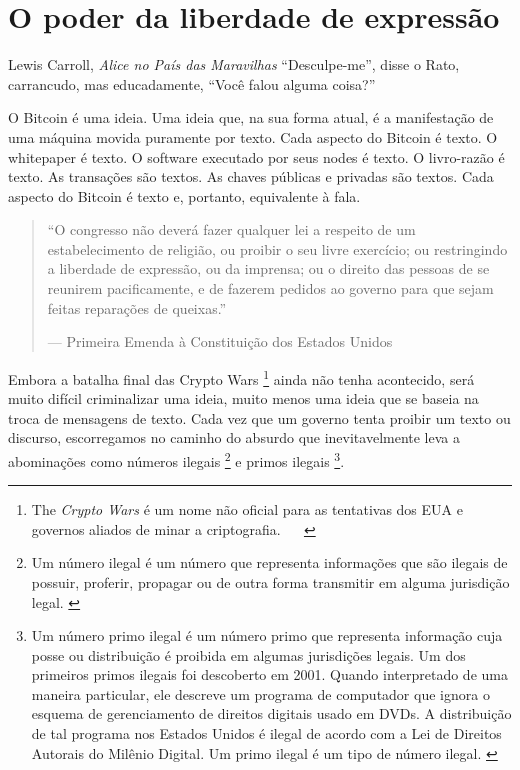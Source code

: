 \chapter{O poder da liberdade de expressão}
\label{les:6}

\begin{chapquote}{Lewis Carroll, \textit{Alice no País das Maravilhas}}
\enquote{Desculpe-me}, disse o Rato, carrancudo, mas educadamente, \enquote{Você falou alguma coisa?}
\end{chapquote}

O Bitcoin é uma ideia. Uma ideia que, na sua forma atual, é a manifestação de uma máquina movida puramente por texto. Cada aspecto do Bitcoin é texto. O whitepaper é texto. O software executado por seus nodes é texto. O livro-razão é texto. As transações são textos. As chaves públicas e privadas são textos. Cada aspecto do Bitcoin é texto e, portanto, equivalente à fala.

\begin{quotation}\begin{samepage}
\enquote{O congresso não deverá fazer qualquer lei a respeito de um estabelecimento de religião, ou proibir o seu livre exercício; ou restringindo a liberdade de expressão, ou da imprensa; ou o direito das pessoas de se reunirem pacificamente, e de fazerem pedidos ao governo para que sejam feitas reparações de queixas.}
\begin{flushright} --- Primeira Emenda à Constituição dos Estados Unidos
\end{flushright}\end{samepage}\end{quotation}

Embora a batalha final das Crypto Wars \footnote{The \textit{Crypto Wars} é um nome não oficial para as tentativas dos EUA e governos aliados de minar a criptografia. ~\cite{eff-cryptowars} ~\cite{wiki:cryptowars}} ainda não tenha acontecido, será muito difícil criminalizar uma ideia, muito menos uma ideia que se baseia na troca de mensagens de texto. Cada vez que um governo tenta proibir um texto ou discurso, escorregamos no caminho do absurdo que inevitavelmente leva a abominações como números ilegais \footnote{Um número ilegal é um número que representa informações que são ilegais de possuir, proferir, propagar ou de outra forma transmitir em alguma jurisdição legal. \cite{wiki:illegal-number}} e primos ilegais \footnote{Um número primo ilegal é um número primo que representa informação cuja posse ou distribuição é proibida em algumas jurisdições legais. Um dos primeiros primos ilegais foi descoberto em 2001. Quando interpretado de uma maneira particular, ele descreve um programa de computador que ignora o esquema de gerenciamento de direitos digitais usado em DVDs. A distribuição de tal programa nos Estados Unidos é ilegal de acordo com a Lei de Direitos Autorais do Milênio Digital. Um primo ilegal é um tipo de número ilegal. \cite{wiki:illegal-prime}}.

